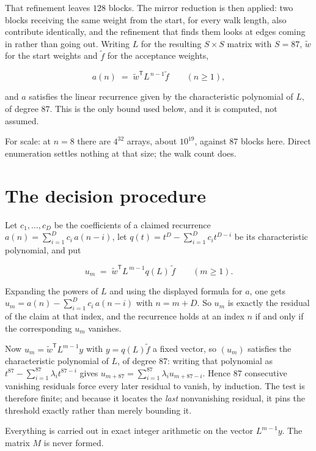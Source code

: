\documentclass[11pt]{article}
\theoremstyle{definition}
\begin{document}
That refinement leaves $128$ blocks. The mirror reduction is then applied: two blocks receiving the same weight from the start, for every walk length, also contribute identically, and the refinement that finds them looks at edges coming in rather than going out. Writing $L$ for the resulting $S \times S$ matrix with $S = 87$, $\tilde w$ for the start weights and $\tilde f$ for the acceptance weights,

\[a(n) \;=\; \tilde w^{\mathsf T} L^{\,n-1} \tilde f \qquad (n \ge 1),\]

and $a$ satisfies the linear recurrence given by the characteristic polynomial of $L$, of degree $87$. This is the only bound used below, and it is computed, not assumed.

For scale: at $n = 8$ there are $4^{32}$ arrays, about $10^{19}$, against $87$ blocks here. Direct enumeration settles nothing at that size; the walk count does.

\section{The decision procedure}

Let $c_1,\dots,c_D$ be the coefficients of a claimed recurrence $a(n) = \sum_{i=1}^{D} c_i\,a(n-i)$, let $q(t) = t^{D} - \sum_{i=1}^{D} c_i t^{D-i}$ be its characteristic polynomial, and put

\[u_m \;=\; \tilde w^{\mathsf T} L^{\,m-1} q(L)\,\tilde f \qquad (m \ge 1).\]

Expanding the powers of $L$ and using the displayed formula for $a$, one gets $u_m = a(n) - \sum_{i=1}^{D} c_i\,a(n-i)$ with $n = m + D$. So $u_m$ is exactly the residual of the claim at that index, and the recurrence holds at an index $n$ if and only if the corresponding $u_m$ vanishes.

Now $u_m = \tilde w^{\mathsf T} L^{m-1} y$ with $y = q(L)\tilde f$ a fixed vector, so $(u_m)$ satisfies the characteristic polynomial of $L$, of degree $87$: writing that polynomial as $t^{87} - \sum_{i=1}^{87} \lambda_i t^{87-i}$ gives $u_{m+87} = \sum_{i=1}^{87} \lambda_i u_{m+87-i}$. Hence $87$ consecutive vanishing residuals force every later residual to vanish, by induction. The test is therefore finite; and because it locates the {\itshape last} nonvanishing residual, it pins the threshold exactly rather than merely bounding it.

Everything is carried out in exact integer arithmetic on the vector $L^{m-1}y$. The matrix $M$ is never formed.
\end{document}
